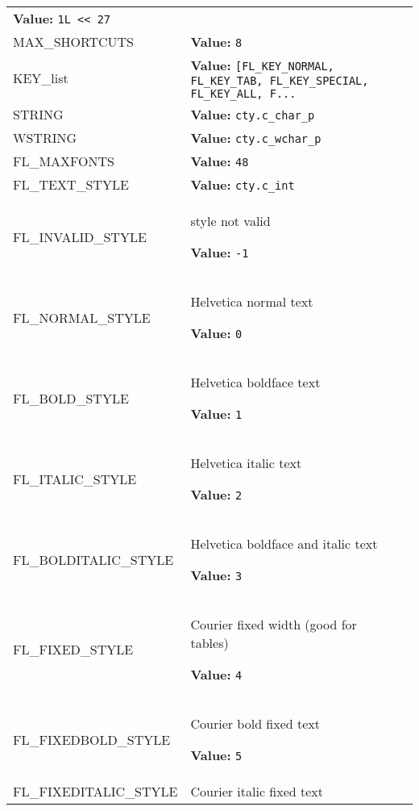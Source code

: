 \begin{longtable}{|p{\varnamewidth}|p{\vardescrwidth}|l}
\textbf{Value:} 
{\tt 1L {\textless}{\textless} 27}&\\
\cline{1-2}
\raggedright M\-A\-X\-\_\-S\-H\-O\-R\-T\-C\-U\-T\-S\- & \raggedright \textbf{Value:} 
{\tt 8}&\\
\cline{1-2}
\raggedright K\-E\-Y\-\_\-l\-i\-s\-t\- & \raggedright \textbf{Value:} 
{\tt [FL\_KEY\_NORMAL, FL\_KEY\_TAB, FL\_KEY\_SPECIAL, FL\_KEY\_ALL, F\texttt{...}}&\\
\cline{1-2}
\raggedright S\-T\-R\-I\-N\-G\- & \raggedright \textbf{Value:} 
{\tt cty.c\_char\_p}&\\
\cline{1-2}
\raggedright W\-S\-T\-R\-I\-N\-G\- & \raggedright \textbf{Value:} 
{\tt cty.c\_wchar\_p}&\\
\cline{1-2}
\raggedright F\-L\-\_\-M\-A\-X\-F\-O\-N\-T\-S\- & \raggedright \textbf{Value:} 
{\tt 48}&\\
\cline{1-2}
\raggedright F\-L\-\_\-T\-E\-X\-T\-\_\-S\-T\-Y\-L\-E\- & \raggedright \textbf{Value:} 
{\tt cty.c\_int}&\\
\cline{1-2}
\raggedright F\-L\-\_\-I\-N\-V\-A\-L\-I\-D\-\_\-S\-T\-Y\-L\-E\- & \raggedright style not valid

\textbf{Value:} 
{\tt -1}&\\
\cline{1-2}
\raggedright F\-L\-\_\-N\-O\-R\-M\-A\-L\-\_\-S\-T\-Y\-L\-E\- & \raggedright Helvetica normal text

\textbf{Value:} 
{\tt 0}&\\
\cline{1-2}
\raggedright F\-L\-\_\-B\-O\-L\-D\-\_\-S\-T\-Y\-L\-E\- & \raggedright Helvetica boldface text

\textbf{Value:} 
{\tt 1}&\\
\cline{1-2}
\raggedright F\-L\-\_\-I\-T\-A\-L\-I\-C\-\_\-S\-T\-Y\-L\-E\- & \raggedright Helvetica italic text

\textbf{Value:} 
{\tt 2}&\\
\cline{1-2}
\raggedright F\-L\-\_\-B\-O\-L\-D\-I\-T\-A\-L\-I\-C\-\_\-S\-T\-Y\-L\-E\- & \raggedright Helvetica boldface and italic text

\textbf{Value:} 
{\tt 3}&\\
\cline{1-2}
\raggedright F\-L\-\_\-F\-I\-X\-E\-D\-\_\-S\-T\-Y\-L\-E\- & \raggedright Courier fixed width (good for tables)

\textbf{Value:} 
{\tt 4}&\\
\cline{1-2}
\raggedright F\-L\-\_\-F\-I\-X\-E\-D\-B\-O\-L\-D\-\_\-S\-T\-Y\-L\-E\- & \raggedright Courier bold fixed text

\textbf{Value:} 
{\tt 5}&\\
\cline{1-2}
\raggedright F\-L\-\_\-F\-I\-X\-E\-D\-I\-T\-A\-L\-I\-C\-\_\-S\-T\-Y\-L\-E\- & \raggedright Courier italic fixed text


\end{longtable}
